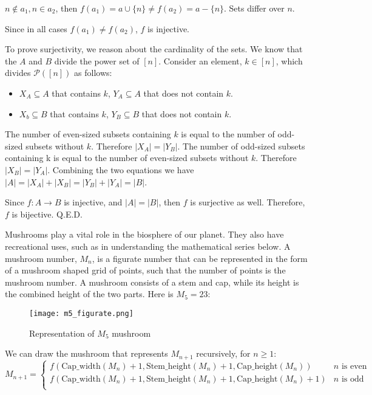 \documentclass[addpoints]{exam}
\begin{document}
\begin{questions}
\begin{solution}
\begin{subparts}
 \subpart $n \not \in a_1, n \in a_2$, then $f(a_1) = a \cup \{n\} \not= f(a_2) = a - \{n\}$. Sets differ over $n$.

 \end{subparts}

 Since in all cases $f(a_1) \not= f(a_2)$, $f$ is injective. 

 To prove surjectivity, we reason about the cardinality of the sets. We know that the $A$ and $B$ divide the power set of $[n]$. Consider an element, $k \in [n]$, which divides $\mathcal{P}([n])$ as follows:

 \begin{itemize}
    \item $X_A \subseteq A$ that contains $k$, $Y_A \subseteq A$ that does not contain $k$.
    
    \item $X_b \subseteq B$ that contains $k$, $Y_B \subseteq B$ that does not contain $k$.
 \end{itemize} 

 The number of even-sized subsets containing $k$ is equal to the number of odd-sized subsets without $k$. Therefore $|X_A| = |Y_B|$. The number of odd-sized subsets containing k is equal to the number of even-sized subsets without $k$. Therefore $|X_B|=|Y_A|$. Combining the two equations we have $|A| = |X_A| + |X_B| = |Y_B| + |Y_A| = |B|$. 

 Since $f : A \rightarrow B$ is injective, and $|A| = |B|$, then $f$ is surjective as well. Therefore, $f$ is bijective. Q.E.D. 

  
  \end{solution}
  
\question Mushrooms play a vital role in the biosphere of our planet. They also have recreational uses, such as in understanding the mathematical series below. A mushroom number, $M_n$, is a figurate number that can be represented in the form of a mushroom shaped grid of points, such that the number of points is the mushroom number. A mushroom consists of a stem and cap, while its height is the combined height of the two parts. Here is $M_5=23$:

\begin{figure}[h]
  \centering
  \texttt{[image: m5\_figurate.png]}
  \caption{Representation of $M_5$ mushroom}
  \label{fig:mushroom_anatomy}
\end{figure}

We can draw the mushroom that represents $M_{n+1}$ recursively, for $n \geq 1$:
\[ 
    M_{n+1}=
    \begin{cases} 
      f(\textrm{Cap\_width}(M_n) + 1, \textrm{Stem\_height}(M_n) + 1, \textrm{Cap\_height}(M_n))  & n \textrm{ is even} \\
      f(\textrm{Cap\_width}(M_n) + 1, \textrm{Stem\_height}(M_n) + 1, \textrm{Cap\_height}(M_n)+1) & n \textrm{ is odd}  \\      
   \end{cases}
\]


\end{questions}
\end{document}
